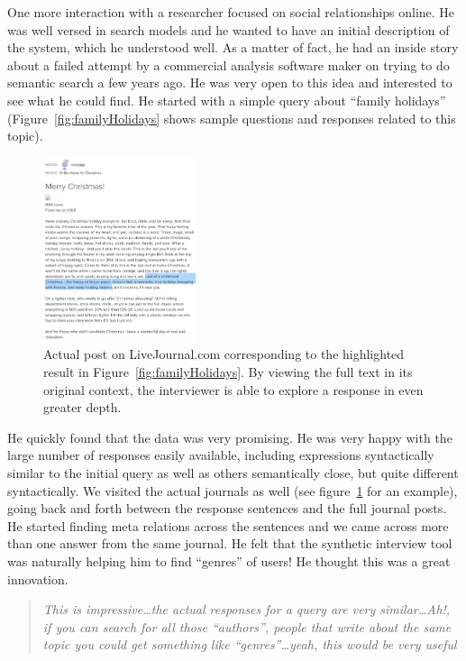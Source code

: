 \documentclass{sigchi}
\begin{document}
One more interaction with a researcher focused on social relationships online. He was well versed in search models and he wanted to have an initial description of the system, which he understood well. As a matter of fact, he had an inside story about a failed attempt by a commercial analysis software maker on trying to do semantic search a few years ago. He was very open to this idea and interested to see what he could find. He started with a simple query about ``family holidays'' (Figure~\ref{fig:familyHolidays} shows sample questions and responses related to this topic).

\begin{figure}[tb]
\centering \includegraphics[width=0.4\textwidth]{figures/examplePost2} 
\caption{Actual post on LiveJournal.com corresponding to the highlighted result in Figure~\ref{fig:familyHolidays}. By viewing the full text in its original context, the interviewer is able to explore a response in even greater depth. \label{fig:examplePost}}
\end{figure}

He quickly found that the data was very promising. He was very happy with the large number of responses easily available, including expressions syntactically similar to the initial query as well as others semantically close, but quite different syntactically. We visited the actual journals as well (see figure~\ref{fig:examplePost} for an example), going back and forth between the response sentences and the full journal posts. He started finding meta relations across the sentences and we came across more than one answer from the same journal. He felt that the synthetic interview tool was naturally helping him to find ``genres'' of users! He thought this was a great innovation. 

\begin{quote}
{\em
This is impressive\dots the actual responses for a query are very similar\dots Ah!, if you can search for all those ``authors'', people that write about the same topic you could get something like ``genres''\dots yeah, this would be very useful
}\end{quote}
\end{document}
